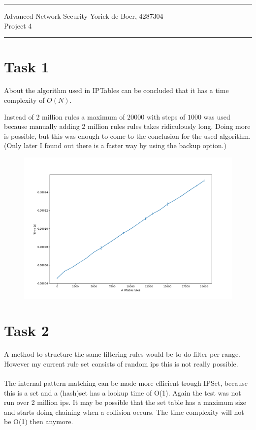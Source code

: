\documentclass{article}
\begin{document}
\setcounter{MaxMatrixCols}{20}

\rule{\textwidth}{1pt}
Advanced Network Security \hfill Yorick de Boer, 4287304 \\
Project 4 \\
\rule{\textwidth}{1pt}
\vspace{0.5cm}

\section{Task 1}
About the algorithm used in IPTables can be concluded that it has a time complexity of $O(N)$. 

Instead of 2 million rules a maximum of $20000$ with steps of $1000$ was used because manually adding 2 million rules rules takes ridiculously long. Doing more is possible, but this was enough to come to the conclusion for the used algorithm. (Only later I found out there is a faster way by using the backup option.)

\begin{figure}[H]
\includegraphics[scale=0.5]{task1}
\end{figure}

\section{Task 2}
A method to structure the same filtering rules would be to do filter per range. However my current rule set consists of random ips this is not really possible. \\
\\
The internal pattern matching can be made more efficient trough IPSet, because this is a set and a (hash)set has a lookup time of O(1). Again the test was not run over 2 million ips. It may be possible that the set table has a maximum size and starts doing chaining when a collision occurs. The time complexity will not be O(1) then anymore. 
\end{document}
